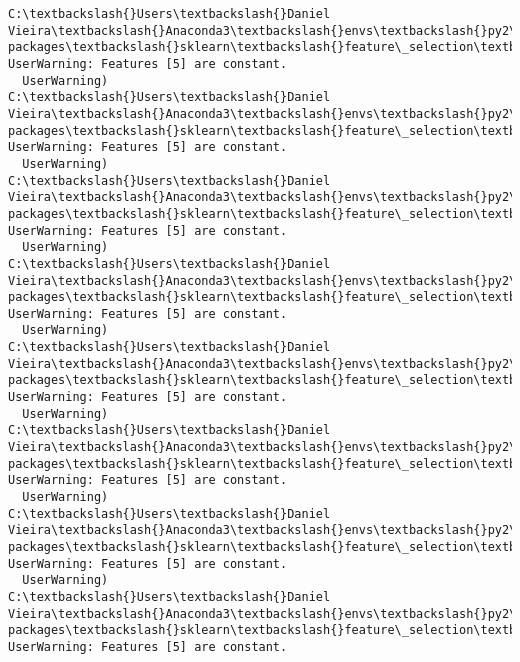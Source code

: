 \documentclass[11pt]{article}
\begin{document}
    \begin{Verbatim}[commandchars=\\\{\}]
C:\textbackslash{}Users\textbackslash{}Daniel Vieira\textbackslash{}Anaconda3\textbackslash{}envs\textbackslash{}py2\textbackslash{}lib\textbackslash{}site-packages\textbackslash{}sklearn\textbackslash{}feature\_selection\textbackslash{}univariate\_selection.py:113: UserWarning: Features [5] are constant.
  UserWarning)
C:\textbackslash{}Users\textbackslash{}Daniel Vieira\textbackslash{}Anaconda3\textbackslash{}envs\textbackslash{}py2\textbackslash{}lib\textbackslash{}site-packages\textbackslash{}sklearn\textbackslash{}feature\_selection\textbackslash{}univariate\_selection.py:113: UserWarning: Features [5] are constant.
  UserWarning)
C:\textbackslash{}Users\textbackslash{}Daniel Vieira\textbackslash{}Anaconda3\textbackslash{}envs\textbackslash{}py2\textbackslash{}lib\textbackslash{}site-packages\textbackslash{}sklearn\textbackslash{}feature\_selection\textbackslash{}univariate\_selection.py:113: UserWarning: Features [5] are constant.
  UserWarning)
C:\textbackslash{}Users\textbackslash{}Daniel Vieira\textbackslash{}Anaconda3\textbackslash{}envs\textbackslash{}py2\textbackslash{}lib\textbackslash{}site-packages\textbackslash{}sklearn\textbackslash{}feature\_selection\textbackslash{}univariate\_selection.py:113: UserWarning: Features [5] are constant.
  UserWarning)
C:\textbackslash{}Users\textbackslash{}Daniel Vieira\textbackslash{}Anaconda3\textbackslash{}envs\textbackslash{}py2\textbackslash{}lib\textbackslash{}site-packages\textbackslash{}sklearn\textbackslash{}feature\_selection\textbackslash{}univariate\_selection.py:113: UserWarning: Features [5] are constant.
  UserWarning)
C:\textbackslash{}Users\textbackslash{}Daniel Vieira\textbackslash{}Anaconda3\textbackslash{}envs\textbackslash{}py2\textbackslash{}lib\textbackslash{}site-packages\textbackslash{}sklearn\textbackslash{}feature\_selection\textbackslash{}univariate\_selection.py:113: UserWarning: Features [5] are constant.
  UserWarning)
C:\textbackslash{}Users\textbackslash{}Daniel Vieira\textbackslash{}Anaconda3\textbackslash{}envs\textbackslash{}py2\textbackslash{}lib\textbackslash{}site-packages\textbackslash{}sklearn\textbackslash{}feature\_selection\textbackslash{}univariate\_selection.py:113: UserWarning: Features [5] are constant.
  UserWarning)
C:\textbackslash{}Users\textbackslash{}Daniel Vieira\textbackslash{}Anaconda3\textbackslash{}envs\textbackslash{}py2\textbackslash{}lib\textbackslash{}site-packages\textbackslash{}sklearn\textbackslash{}feature\_selection\textbackslash{}univariate\_selection.py:113: UserWarning: Features [5] are constant.

\end{Verbatim}
\end{document}
